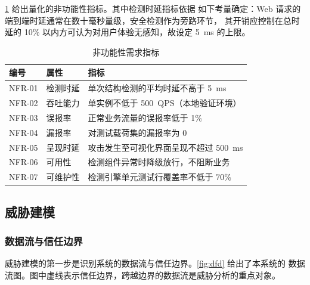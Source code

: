 \cref{tab:nonfunctional-req} 给出量化的非功能性指标。其中检测时延指标依据
如下考量确定：Web 请求的端到端时延通常在数十毫秒量级，安全检测作为旁路环节，
其开销应控制在总时延的 10\% 以内方可认为对用户体验无感知，故设定 5~ms 的上限。

\begin{table}[htbp]
\centering
\caption{非功能性需求指标}
\label{tab:nonfunctional-req}
\small
\begin{tabular}{@{}l l l@{}}
\toprule
\textbf{编号} & \textbf{属性} & \textbf{指标} \\
\midrule
NFR-01 & 检测时延   & 单次结构检测的平均时延不高于 5~ms \\
NFR-02 & 吞吐能力   & 单实例不低于 500~QPS（本地验证环境） \\
NFR-03 & 误报率     & 正常业务流量的误报率低于 1\% \\
NFR-04 & 漏报率     & 对测试载荷集的漏报率为 0 \\
NFR-05 & 呈现时延   & 攻击发生至可视化界面呈现不超过 500~ms \\
NFR-06 & 可用性     & 检测组件异常时降级放行，不阻断业务 \\
NFR-07 & 可维护性   & 检测引擎单元测试行覆盖率不低于 70\% \\
\bottomrule
\end{tabular}
\end{table}

\subsection{威胁建模}

\subsubsection{数据流与信任边界}

威胁建模的第一步是识别系统的数据流与信任边界。\cref{fig:dfd} 给出了本系统的
数据流图。图中虚线表示信任边界，跨越边界的数据流是威胁分析的重点对象。


